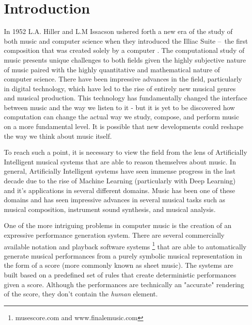 
\chapter{Introduction}

In 1952 L.A. Hiller and L.M Issacson ushered forth a new era of the study of both music and computer science when they introduced the Illiac Suite – the first composition that was created solely by a computer \cite{sandred2009revisiting}. The computational study of music presents unique challenges to both fields given the highly subjective nature of music paired with the highly quantitative and mathematical nature of computer science. There have been impressive advances in the field, particularly in digital technology, which have led to the rise of entirely new musical genres and musical production. This technology has fundamentally changed the interface between music and the way we listen to it - but it is yet to be discovered how computation can change the actual way we study, compose, and perform music on a more fundamental level. It is possible that new developments could reshape the way we think about music itself. 

To reach such a point, it is necessary to view the field from the lens of Artificially Intelligent musical systems that are able to reason themselves about music. In general, Artificially Intelligent systems have seen immense progress in the last decade due to the rise of Machine Learning (particularly with Deep Learning) and it's applications in several different domains. Music has been one of these domains and has seen impressive advances in several musical tasks such as musical composition\cite{huang2018music}, instrument sound synthesis\cite{engel2017neural}, and musical analysis\cite{widmer2016getting}. 

One of the more intriguing problems in computer music is the creation of an expressive performance generation system. There are several commercially available notation and playback software systems \footnote{musescore.com and www.finalemusic.com} that are able to automatically generate musical performances from a purely symbolic musical representation in the form of a score (more commonly known as sheet music). The systems are built based on a predefined set of rules that create deterministic performances given a score. Although the performances are technically an "accurate" rendering of the score, they don't contain the \emph{human} element.

